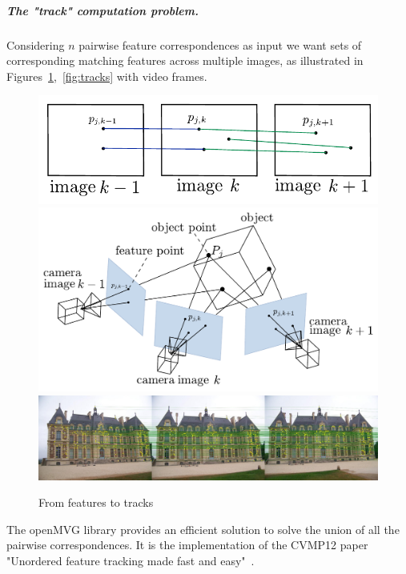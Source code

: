 \documentclass[11pt, letterpaper]{report}
\begin{document}
\subparagraph{The "track" computation problem.}
Considering $n$ pairwise feature correspondences as input we want sets of corresponding matching features across multiple images, as illustrated in Figures~\ref{fig:tracks_intro},~\ref{fig:tracks} with video frames.

\noindent
\begin{figure}[h!]
\begin{center}
\includegraphics[scale=.6]{figures/feat_tracking/Tracks}
\includegraphics[scale=.4]{figures/SfM_geometry.pdf}
\includegraphics[scale=.22]{figures/feat_tracking/feat_Tracking}
\caption{From features to tracks}
\label{fig:tracks_intro}
\end{center}
\end{figure}

\newpage
The openMVG library provides an efficient solution to solve the union of all the pairwise correspondences. It is the implementation of the CVMP12 paper "Unordered feature tracking made fast and easy"~\cite{MOULON/CVMP12}.
\end{document}
